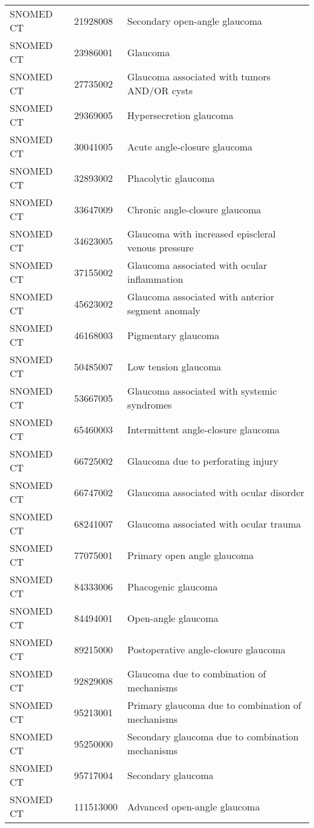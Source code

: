 \begin{longtable}{p{}p{}p{}}
  SNOMED CT & 21928008 & Secondary open-angle glaucoma \\ 
  SNOMED CT & 23986001 & Glaucoma \\ 
  SNOMED CT & 27735002 & Glaucoma associated with tumors AND/OR cysts \\ 
  SNOMED CT & 29369005 & Hypersecretion glaucoma \\ 
  SNOMED CT & 30041005 & Acute angle-closure glaucoma \\ 
  SNOMED CT & 32893002 & Phacolytic glaucoma \\ 
  SNOMED CT & 33647009 & Chronic angle-closure glaucoma \\ 
  SNOMED CT & 34623005 & Glaucoma with increased episcleral venous pressure \\ 
  SNOMED CT & 37155002 & Glaucoma associated with ocular inflammation \\ 
  SNOMED CT & 45623002 & Glaucoma associated with anterior segment anomaly \\ 
  SNOMED CT & 46168003 & Pigmentary glaucoma \\ 
  SNOMED CT & 50485007 & Low tension glaucoma \\ 
  SNOMED CT & 53667005 & Glaucoma associated with systemic syndromes \\ 
  SNOMED CT & 65460003 & Intermittent angle-closure glaucoma \\ 
  SNOMED CT & 66725002 & Glaucoma due to perforating injury \\ 
  SNOMED CT & 66747002 & Glaucoma associated with ocular disorder \\ 
  SNOMED CT & 68241007 & Glaucoma associated with ocular trauma \\ 
  SNOMED CT & 77075001 & Primary open angle glaucoma \\ 
  SNOMED CT & 84333006 & Phacogenic glaucoma \\ 
  SNOMED CT & 84494001 & Open-angle glaucoma \\ 
  SNOMED CT & 89215000 & Postoperative angle-closure glaucoma \\ 
  SNOMED CT & 92829008 & Glaucoma due to combination of mechanisms \\ 
  SNOMED CT & 95213001 & Primary glaucoma due to combination of mechanisms \\ 
  SNOMED CT & 95250000 & Secondary glaucoma due to combination mechanisms \\ 
  SNOMED CT & 95717004 & Secondary glaucoma \\ 
  SNOMED CT & 111513000 & Advanced open-angle glaucoma \\ 

\end{longtable}
